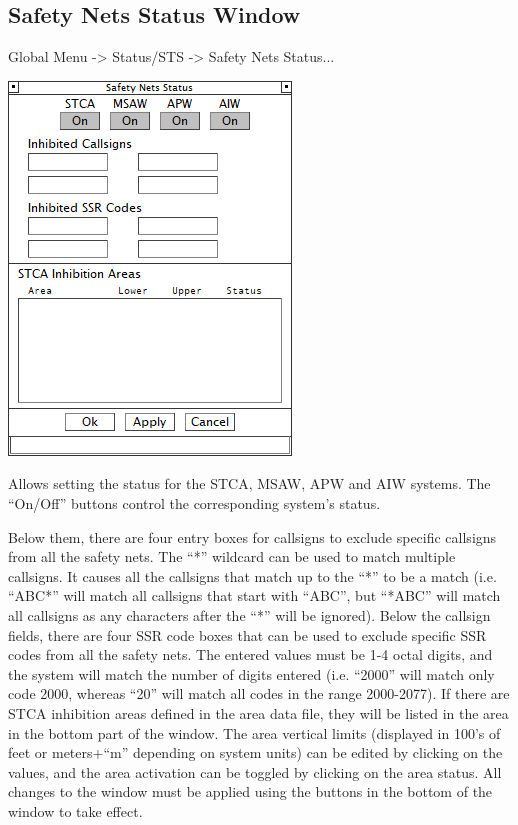 \documentclass[11pt,a4paper]{memoir}
\begin{document}
\subsection{Safety Nets Status Window}
\label{win:snsw}

Global Menu -> Status/STS -> Safety Nets Status...

\includegraphics{img/snets.png}

Allows setting the status for the STCA, MSAW, APW and AIW systems. The “On/Off” buttons control the corresponding system’s status.

Below them, there are four entry boxes for callsigns to exclude specific callsigns from all the safety nets. The “*” wildcard can be used to match multiple callsigns. It causes all the callsigns that match up to the “*” to be a match (i.e. “ABC*” will match all callsigns that start with “ABC”, but “*ABC” will match all callsigns as any characters after the “*” will be ignored).
Below the callsign fields, there are four SSR code boxes that can be used to exclude specific SSR codes from all the safety nets. The entered values must be 1-4 octal digits, and the system will match the number of digits entered (i.e. “2000” will match only code 2000, whereas “20” will match all codes in the range 2000-2077).
If there are STCA inhibition areas defined in the area data file, they will be listed in the area in the bottom part of the window. The area vertical limits (displayed in 100’s of feet or meters+“m” depending on system units) can be edited by clicking on the values, and the area activation can be toggled by clicking on the area status.
All changes to the window must be applied using the buttons in the bottom of the window to take effect.
\end{document}
